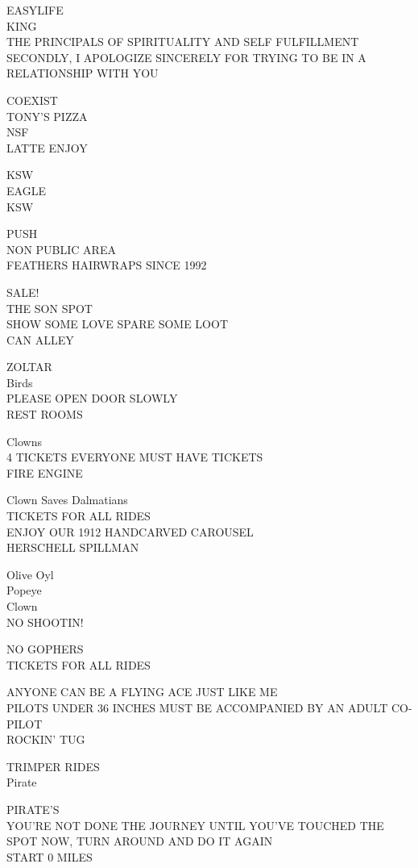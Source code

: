 \documentclass[10pt,letterpaper]{article}
\begin{document}
EASYLIFE\\
KING\\
THE PRINCIPALS OF SPIRITUALITY AND SELF FULFILLMENT\\
SECONDLY, I APOLOGIZE SINCERELY FOR TRYING TO BE IN A RELATIONSHIP WITH YOU

COEXIST\\
TONY'S PIZZA\\
NSF\\
LATTE ENJOY

KSW\\
EAGLE\\
KSW

PUSH\\
NON PUBLIC AREA\\
FEATHERS HAIRWRAPS SINCE 1992

SALE!\\
THE SON SPOT\\
SHOW SOME LOVE SPARE SOME LOOT\\
CAN ALLEY

ZOLTAR\\
Birds\\
PLEASE OPEN DOOR SLOWLY\\
REST ROOMS

Clowns\\
4 TICKETS EVERYONE MUST HAVE TICKETS\\
FIRE ENGINE

Clown Saves Dalmatians\\
TICKETS FOR ALL RIDES\\
ENJOY OUR 1912 HANDCARVED CAROUSEL\\
HERSCHELL SPILLMAN

Olive Oyl\\
Popeye\\
Clown\\
NO SHOOTIN!

NO GOPHERS\\
TICKETS FOR ALL RIDES

ANYONE CAN BE A FLYING ACE JUST LIKE ME\\
PILOTS UNDER 36 INCHES MUST BE ACCOMPANIED BY AN ADULT CO{-}PILOT\\
ROCKIN' TUG

TRIMPER RIDES\\
Pirate

PIRATE'S\\
YOU'RE NOT DONE THE JOURNEY UNTIL YOU'VE TOUCHED THE SPOT NOW, TURN AROUND AND DO IT AGAIN\\
START 0 MILES
\end{document}
